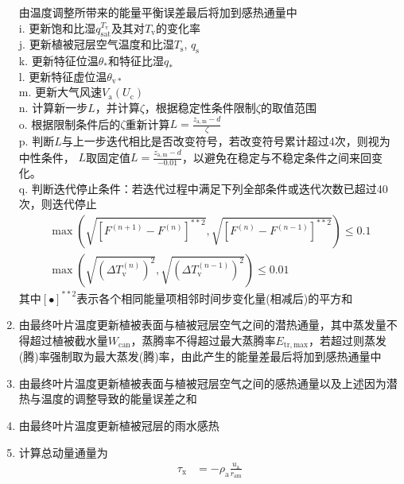 \begin{enumerate}
    由温度调整所带来的能量平衡误差最后将加到感热通量中\\
    i. 更新饱和比湿$q_{\mathrm{sat}}^{T_{\mathrm v}}$及其对$T_{\mathrm v}$的变化率 \\
    j. 更新植被冠层空气温度和比湿$T_{\mathrm {s}}$, $q_{\mathrm {s}}$ \\
    k. 更新特征位温$\theta_\ast$和特征比湿$q_\ast$ \\
    l. 更新特征虚位温$\theta_{\mathrm{v\ast}}$ \\
    m. 更新大气风速$V_{\mathrm a}\left(U_{\mathrm c}\right)$ \\
    n. 计算新一步$L$，并计算$\zeta$，根据稳定性条件限制$\zeta$的取值范围 \\
    o. 根据限制条件后的$\zeta$重新计算$L=\frac{z_{\mathrm{a,m}}-d}{\zeta}$ \\
    p. 判断$L$与上一步迭代相比是否改变符号，若改变符号累计超过4次，则视为中性条件，
    $L$取固定值$L=\frac{z_{\mathrm{a,m}}-d}{-0.01}$，以避免在稳定与不稳定条件之间来回变化。\\
    q. 判断迭代停止条件：若迭代过程中满足下列全部条件或迭代次数已超过40次，则迭代停止
    \begin{equation}\label{eq:iterstop}
      \begin{array}{l}\max\left( \sqrt{\left[F^{(n+1)}-F^{(n)}\right]^{\ast\ast2}}, \sqrt{\left[F^{(n)}-F^{(n-1)}\right]^{\ast\ast2}} \right) \leqslant 0.1 \\[3.0 ex]
      \max\left( \sqrt{\left(\Delta T_{\mathrm{v}}^{(n)}\right)^{2}}, \sqrt{\left(\Delta T_{\mathrm{v}}^{(n-1)}\right)^{2}} \right) \leqslant 0.01\end{array}
    \end{equation}
    其中$\left[\bullet\right]^{\ast\ast2}$表示各个相同能量项相邻时间步变化量(相减后)的平方和
  \item 由最终叶片温度更新植被表面与植被冠层空气之间的潜热通量，其中蒸发量不得超过植被截水量$W_{\mathrm{can}}$，蒸腾率不得超过最大蒸腾率$ E_{\mathrm{tr,max}}$，若超过则蒸发(腾)率强制取为最大蒸发(腾)率，由此产生的能量差最后将加到感热通量中
  \item 由最终叶片温度更新植被表面与植被冠层空气之间的感热通量以及上述因为潜热与温度的调整导致的能量误差之和
  \item 由最终叶片温度更新植被冠层的雨水感热
  \item 计算总动量通量为
    \begin{equation}
      \begin{aligned}
        \tau_{\mathrm{x}} &=- \rho_{\mathrm{a}} \frac{u_{\mathrm{a}}}{r_{\mathrm{a m}}} \\[1ex]

\end{aligned}
\end{equation}
\end{enumerate}
